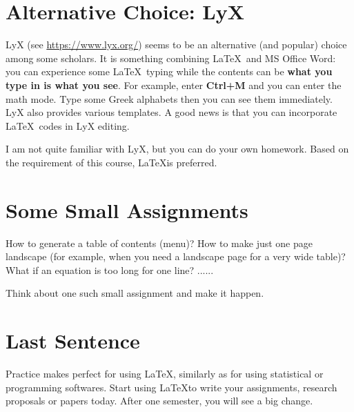 \documentclass[10pt]{extarticle}
\theoremstyle{theorem}
\theoremstyle{lemma}
\theoremstyle{proposition}
\theoremstyle{corollary}
\theoremstyle{assumption}
\theoremstyle{model}
\theoremstyle{property}
\theoremstyle{example}
\theoremstyle{algorithm}
\theoremstyle{definition}
\theoremstyle{axiom}
\theoremstyle{remark}
\begin{document}
\renewcommand\refname{References}




\section{Alternative Choice: LyX}

LyX (see \href{https://www.lyx.org/}{https://www.lyx.org/}) seems to be an alternative (and popular) choice among some scholars. It is something combining \LaTeX \ and MS Office Word: you can experience some \LaTeX \ typing while the contents can be \textbf{what you type in is what you see}. For example, enter \textbf{Ctrl+M} and you can enter the math mode. Type some Greek alphabets then you can see them immediately. LyX also provides various templates. A good news is that you can incorporate \LaTeX \ codes in LyX editing.

I am not quite familiar with LyX, but you can do your own homework. Based on the requirement of this course, \LaTeX is preferred.

\section{Some Small Assignments}

How to generate a table of contents (menu)? How to make just one page landscape (for example, when you need a landscape page for a very wide table)? What if an equation is too long for one line? ......

Think about one such small assignment and make it happen.

\section{Last Sentence}
Practice makes perfect for using \LaTeX, similarly as for using statistical or programming softwares. Start using \LaTeX to write your assignments, research proposals or papers today. After one semester, you will see a big change.
\end{document}
